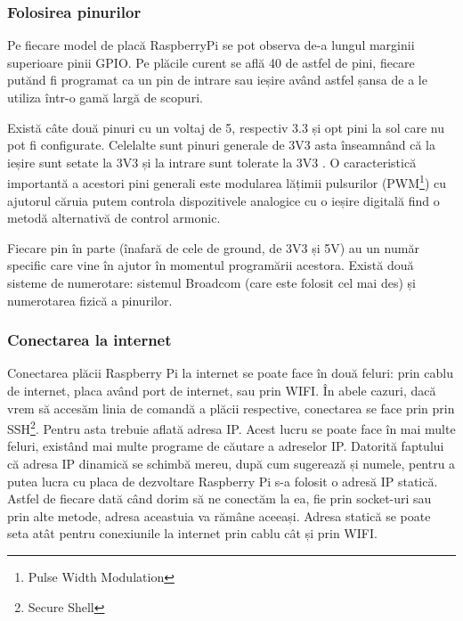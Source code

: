 \documentclass[../IoMusT.tex]{subfiles}
\begin{document}
\subsubsection{Folosirea pinurilor}
Pe fiecare model de placă RaspberryPi se pot observa de-a lungul marginii  superioare pinii GPIO. Pe plăcile curent se află 40 de astfel de pini, fiecare putănd fi programat ca un pin de intrare sau ieșire având astfel șansa de a le utiliza într-o gamă largă de scopuri.
\\
\par Există câte două pinuri cu un voltaj de 5, respectiv 3.3 și opt pini la sol care nu pot fi configurate. Celelalte sunt pinuri generale de 3V3 asta înseamnând că la ieșire sunt setate la 3V3 și la intrare sunt tolerate la 3V3 \cite{RaspPi}. O caracteristică importantă a acestori pini generali este modularea lățimii pulsurilor (PWM\footnote{Pulse Width Modulation}) cu ajutorul căruia putem controla dispozitivele analogice cu o ieșire digitală \cite{PWM} find o metodă alternativă de control armonic. 
\\
\par Fiecare pin în parte (înafară de cele de ground, de 3V3 și 5V) au un număr specific care vine în ajutor în momentul programării acestora. Există două sisteme de numerotare: sistemul Broadcom (care este folosit cel mai des) și numerotarea fizică a pinurilor.

\subsubsection{Conectarea la internet}
Conectarea plăcii Raspberry Pi la internet se poate face în două feluri: prin cablu de internet, placa având port de internet, sau prin WIFI. În abele cazuri, dacă vrem să accesăm linia de comandă a plăcii respective, conectarea se face prin prin SSH\footnote{Secure Shell}. Pentru asta trebuie aflată adresa IP. Acest lucru se poate face în mai multe feluri, existând mai multe programe de căutare a adreselor IP. Datorită faptului că adresa IP dinamică se schimbă mereu, după cum sugerează și numele, pentru a putea lucra cu placa de dezvoltare Raspberry Pi s-a folosit o adresă IP statică. Astfel de fiecare dată când dorim să ne conectăm la ea, fie prin socket-uri sau prin alte metode, adresa aceastuia va rămâne aceeași. Adresa statică se poate seta atât pentru conexiunile la internet prin cablu cât și prin WIFI.
\end{document}
